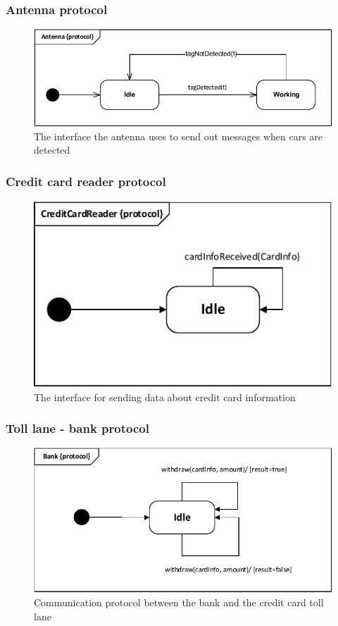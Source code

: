 \subsubsection*{Antenna protocol}
\begin{figure}[H]
\centering
\includegraphics[width=0.7\linewidth]{img/behaviour_state_machines/protocol_state_machines/protocol_state_machine_antenna}
\caption{The interface the antenna uses to send out messages when cars are detected}
\label{fig:protocol_state_machine_antenna}
\end{figure}

\subsubsection*{Credit card reader protocol}
\begin{figure}[H]
\centering
\includegraphics[width=0.7\linewidth]{img/behaviour_state_machines/protocol_state_machines/protocol_state_machine_tlc_to_ccr}
\caption{The interface for sending data about credit card information}
\label{fig:protocol_state_machine_tlc_to_ccr}
\end{figure}

\subsubsection*{Toll lane - bank protocol}
\begin{figure}[H]
\centering
\includegraphics[width=0.7\linewidth]{img/behaviour_state_machines/protocol_state_machines/protocol_state_machine_tlc_to_bank}
\caption{Communication protocol between the bank and the credit card toll lane}
\label{fig:protocol_state_machine_tlc_to_bank}
\end{figure}

